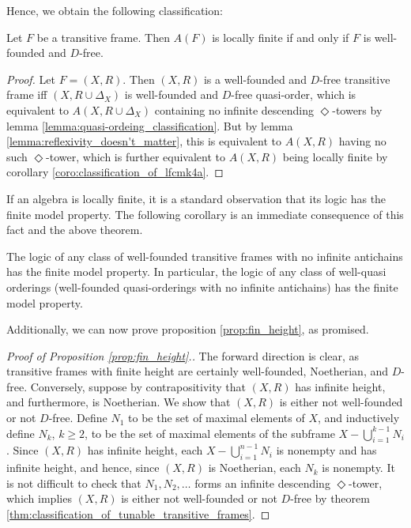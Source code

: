 \documentclass[submission]{eptcs}
\begin{document}
Hence, we obtain the following classification:

\begin{theorem} \label{thm:classification_of_tunable_transitive_frames}
    Let $F$ be a transitive frame. Then $A(F)$ is locally finite if and only if $F$ is well-founded and $D$-free.
\end{theorem}

\begin{proof}
    Let $F=(X,R)$. Then $(X,R)$ is a well-founded and $D$-free transitive frame iff $(X,R\cup \Delta_X)$ is well-founded and $D$-free quasi-order, which is equivalent to $A(X,R\cup \Delta_X)$ containing no infinite descending $\Diamond$-towers by lemma \ref{lemma:quasi-ordeing_classification}.
    But by lemma \ref{lemma:reflexivity_doesn't_matter}, this is equivalent to $A(X,R)$ having no such $\Diamond$-tower, which is further equivalent to $A(X,R)$ being locally finite by corollary \ref{coro:classification_of_lfcmk4a}.
\end{proof}

If an algebra is locally finite, it is a standard observation that its logic has the finite model property.
The following corollary is an immediate consequence of this fact and the above theorem.

\begin{corollary}
    The logic of any class of well-founded transitive frames with no infinite antichains has the finite model property. 
    In particular, the logic of any class of well-quasi orderings (well-founded quasi-orderings with no infinite antichains) has the finite model property.
\end{corollary}

Additionally, we can now prove proposition \ref{prop:fin_height}, as promised.

\begin{proof}[Proof of Proposition \ref{prop:fin_height}.]
    The forward direction is clear, as transitive frames with finite height are certainly well-founded, Noetherian, and $D$-free.
    Conversely, suppose by contrapositivity that $(X,R)$ has infinite height, and furthermore, is Noetherian. We show that $(X,R)$ is either not well-founded or not $D$-free. 
    Define $N_1$ to be the set of maximal elements of $X$, and inductively define $N_k$, $k\geq 2$, to be the set of maximal elements of the subframe $X-\bigcup_{i=1}^{k-1}N_i$.
    Since $(X,R)$ has infinite height, each $X-\bigcup_{i=1}^{n-1}N_i$ is nonempty and has infinite height, and hence, since $(X,R)$ is Noetherian, each $N_k$ is nonempty.
    It is not difficult to check that $N_1,N_2,\dots$ forms an infinite descending $\Diamond$-tower, which implies $(X,R)$ is either not well-founded or not $D$-free by theorem \ref{thm:classification_of_tunable_transitive_frames}.
\end{proof}
\end{document}
